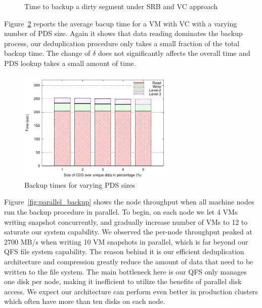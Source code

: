 
\begin{figure}[htbp]
  \centering
  \caption{Time to backup a dirty segment under SRB and VC approach}
  \label{fig:srb_vs_vc}
\end{figure}

Figure~\ref{fig:single_vm_backup} reports the average bacup time for a VM with VC with a varying number
of PDS size.
Again it shows that data reading dominates the backup process, our deduplication
procedure only takes a small fraction of the total backup time. 
The change of $\delta$ does not significantly affects the overall time and
PDS lookup takes a small amount of time.


\begin{figure}
    \centering
    \includegraphics[width=3in]{figures/single_backup_time}
    \caption{Backup times for varying PDS sizes}
    \label{fig:single_vm_backup}
\end{figure}


    Figure~\ref{fig:parallel_backup} shows the node throughput when all machine nodes run
the backup procedure in parallel.
To begin, on each node we let 4 VMs writing snapshot concurrently, and gradually 
increase number of VMs to 12 to saturate our system capability. We observed 
the per-node throughput peaked at 2700 MB/s when writing 10 VM snapshots in parallel, 
which is far beyond our QFS file system capability. The reason behind it is our efficient
deduplication architecture and compression greatly reduce the amount of data that need to be written to
the file system. The main bottleneck here is our QFS only manages one disk per node, 
making it inefficient to utilize the benefits of parallel disk access. We expect our architecture can
perform even better in production clusters which often have more than ten disks on each node.



